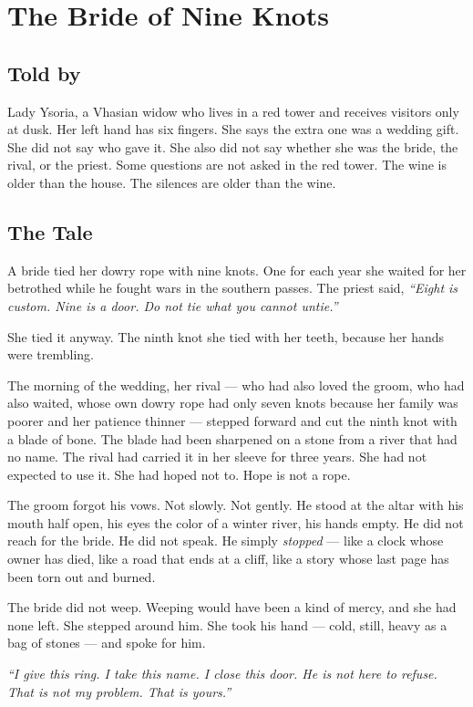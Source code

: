 \chapter{The Bride of Nine Knots}

\section*{Told by}
Lady Ysoria, a Vhasian widow who lives in a red tower and receives visitors only at dusk. Her left hand has six fingers. She says the extra one was a wedding gift. She did not say who gave it. She also did not say whether she was the bride, the rival, or the priest. Some questions are not asked in the red tower. The wine is older than the house. The silences are older than the wine.

\section*{The Tale}

A bride tied her dowry rope with nine knots. One for each year she waited for her betrothed while he fought wars in the southern passes. The priest said, \textit{``Eight is custom. Nine is a door. Do not tie what you cannot untie.''}

She tied it anyway. The ninth knot she tied with her teeth, because her hands were trembling.

The morning of the wedding, her rival — who had also loved the groom, who had also waited, whose own dowry rope had only seven knots because her family was poorer and her patience thinner — stepped forward and cut the ninth knot with a blade of bone. The blade had been sharpened on a stone from a river that had no name. The rival had carried it in her sleeve for three years. She had not expected to use it. She had hoped not to. Hope is not a rope.

The groom forgot his vows. Not slowly. Not gently. He stood at the altar with his mouth half open, his eyes the color of a winter river, his hands empty. He did not reach for the bride. He did not speak. He simply \textit{stopped} — like a clock whose owner has died, like a road that ends at a cliff, like a story whose last page has been torn out and burned.

The bride did not weep. Weeping would have been a kind of mercy, and she had none left. She stepped around him. She took his hand — cold, still, heavy as a bag of stones — and spoke for him.

\textit{``I give this ring. I take this name. I close this door. He is not here to refuse. That is not my problem. That is yours.''}

